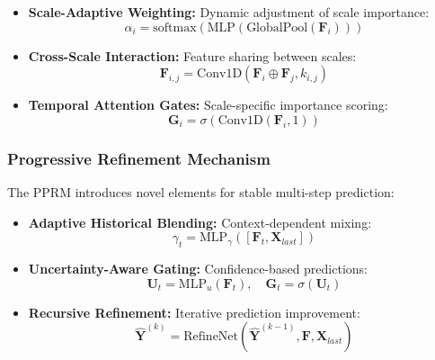 \documentclass[lettersize, journal]{IEEEtran}
\begin{document}
\begin{itemize}
    \item \textbf{Scale-Adaptive Weighting:} Dynamic adjustment of scale importance:
    \begin{equation}
    \alpha_i = \text{softmax}(\text{MLP}(\text{GlobalPool}(\mathbf{F}_i)))
    \end{equation}
    
    \item \textbf{Cross-Scale Interaction:} Feature sharing between scales:
    \begin{equation}
    \mathbf{F}_{i,j} = \text{Conv1D}(\mathbf{F}_i \oplus \mathbf{F}_j, k_{i,j})
    \end{equation}
    
    \item \textbf{Temporal Attention Gates:} Scale-specific importance scoring:
    \begin{equation}
    \mathbf{G}_i = \sigma(\text{Conv1D}(\mathbf{F}_i, 1))
    \end{equation}
\end{itemize}

\subsubsection{Progressive Refinement Mechanism}
The PPRM introduces novel elements for stable multi-step prediction:

\begin{itemize}
    \item \textbf{Adaptive Historical Blending:} Context-dependent mixing:
    \begin{equation}
    \gamma_t = \text{MLP}_{\gamma}([\mathbf{F}_t, \mathbf{X}_{last}])
    \end{equation}
    
    \item \textbf{Uncertainty-Aware Gating:} Confidence-based predictions:
    \begin{equation}
    \mathbf{U}_t = \text{MLP}_u(\mathbf{F}_t), \quad \mathbf{G}_t = \sigma(\mathbf{U}_t)
    \end{equation}
    
    \item \textbf{Recursive Refinement:} Iterative prediction improvement:
    \begin{equation}
    \hat{\mathbf{Y}}^{(k)} = \text{RefineNet}(\hat{\mathbf{Y}}^{(k-1)}, \mathbf{F}, \mathbf{X}_{last})
    \end{equation}
\end{itemize}
\end{document}

